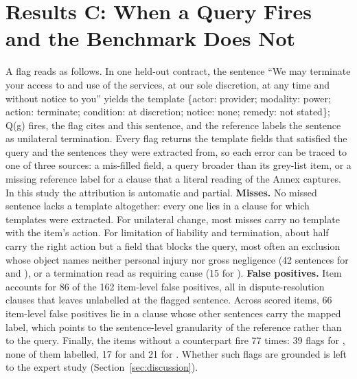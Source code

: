\section{Results C: When a Query Fires and the Benchmark Does Not}
\label{sec:audit}
A flag reads as follows. In one held-out contract, the sentence ``We may terminate your access to and use of the services, at our sole discretion, at any time and without notice to you'' yields the template \{actor: provider; modality: power; action: terminate; condition: at discretion; notice: none; remedy: not stated\}; Q(g) fires, the flag cites  and this sentence, and the reference labels the sentence as unilateral termination. Every flag returns the template fields that satisfied the query and the sentences they were extracted from, so each error can be traced to one of three sources: a mis-filled field, a query broader than its grey-list item, or a missing reference label for a clause that a literal reading of the Annex captures. In this study the attribution is automatic and partial. \textbf{Misses.} No missed sentence lacks a template altogether: every one lies in a clause for which templates were extracted. For unilateral change, most misses carry no template with the item's action. For limitation of liability and termination, about half carry the right action but a field that blocks the query, most often an exclusion whose object names neither personal injury nor gross negligence (42 sentences for  and ), or a termination read as requiring cause (15 for ). \textbf{False positives.} Item  accounts for 86 of the 162 item-level false positives, all in dispute-resolution clauses that \corpus{} leaves unlabelled at the flagged sentence. Across scored items, 66 item-level false positives lie in a clause whose other sentences carry the mapped label, which points to the sentence-level granularity of the reference rather than to the query. Finally, the items without a \corpus{} counterpart fire 77 times: 39 flags for , none of them labelled, 17 for  and 21 for . Whether such flags are grounded is left to the expert study (Section~\ref{sec:discussion}).

